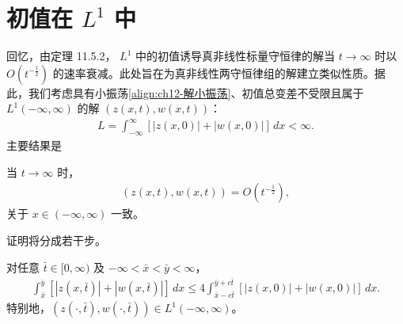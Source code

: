 \documentclass[../../main.tex]{subfiles}
\begin{document}
\section{初值在 $L^1$ 中}\label{section:ch12-L1估计}

回忆，由定理 11.5.2，
$L^1$ 中的初值诱导真非线性标量守恒律的解当 $t\to\infty$ 时以 $O(t^{-\frac12})$ 的速率衰减。此处旨在为真非线性两守恒律组的解建立类似性质。据此，我们考虑具有小振荡\eqref{align:ch12-解小振荡}、初值总变差不受限且属于 $L^1(-\infty,\infty)$ 的解 $(z(x,t),w(x,t))$：
\begin{align}
L=\int_{-\infty}^{\infty}[|z(x,0)|+|w(x,0)|]\,dx<\infty.
\label{align:ch12-L1}
\end{align}
主要结果是

\begin{theorem}\label{theorem:ch12-L1衰减}
当 $t\to\infty$ 时，
\begin{align}
(z(x,t),w(x,t))=O(t^{-\frac12}),
\label{align:ch12-L1衰减}
\end{align}
关于 $x\in(-\infty,\infty)$ 一致。
\end{theorem}

证明将分成若干步。

\begin{lemma}\label{lemma:ch12-L1积分}
对任意 $\bar t\in[0,\infty)$ 及 $-\infty<\bar x<\bar y<\infty$，
\begin{align}
\int_{\bar x}^{\bar y}[|z(x,\bar t)|+|w(x,\bar t)|]\,dx\leqslant 4\int_{\bar x-c\bar t}^{\bar y+c\bar t}[|z(x,0)|+|w(x,0)|]\,dx.
\label{align:ch12-L1积分}
\end{align}
特别地，$(z(\cdot,\bar t),w(\cdot,\bar t))\in L^1(-\infty,\infty)$。
\end{lemma}
\end{document}
